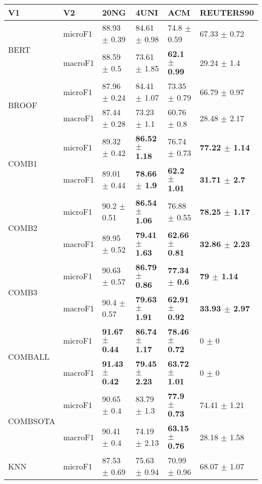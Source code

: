 \documentclass[]{article}
\begin{document}
\begin{table}[ht]
\centering
\begin{tabular}{llllll}
  \hline
V1 & V2 & 20NG & 4UNI & ACM & REUTERS90 \\ 
  \cline{3-6} \hline
\multirow{2}{*}{BERT} & microF1 & 88.93 $\pm$  0.39 & 84.61 $\pm$  0.98 & 74.8 $\pm$  0.59 & 67.33 $\pm$  0.72 \\ 
   & macroF1 & 88.59 $\pm$  0.5 & 73.61 $\pm$  1.85 & \bf{62.1 $\pm$  0.99} & 29.24 $\pm$  1.4 \\ 
   \cline{3-6}\multirow{2}{*}{BROOF} & microF1 & 87.96 $\pm$  0.24 & 84.41 $\pm$  1.07 & 73.35 $\pm$  0.79 & 66.79 $\pm$  0.97 \\ 
   & macroF1 & 87.44 $\pm$  0.28 & 73.23 $\pm$  1.1 & 60.76 $\pm$  0.8 & 28.48 $\pm$  2.17 \\ 
   \cline{3-6}\multirow{2}{*}{COMB1} & microF1 & 89.32 $\pm$  0.42 & \bf{86.52 $\pm$  1.18} & 76.74 $\pm$  0.73 & \bf{77.22 $\pm$  1.14} \\ 
   & macroF1 & 89.01 $\pm$  0.44 & \bf{78.66 $\pm$  1.9} & \bf{62.2 $\pm$  1.01} & \bf{31.71 $\pm$  2.7} \\ 
   \cline{3-6}\multirow{2}{*}{COMB2} & microF1 & 90.2 $\pm$  0.51 & \bf{86.54 $\pm$  1.06} & 76.88 $\pm$  0.55 & \bf{78.25 $\pm$  1.17} \\ 
   & macroF1 & 89.95 $\pm$  0.52 & \bf{79.41 $\pm$  1.63} & \bf{62.66 $\pm$  0.81} & \bf{32.86 $\pm$  2.23} \\ 
   \cline{3-6}\multirow{2}{*}{COMB3} & microF1 & 90.63 $\pm$  0.57 & \bf{86.79 $\pm$  0.86} & \bf{77.34 $\pm$  0.6} & \bf{79 $\pm$  1.14} \\ 
   & macroF1 & 90.4 $\pm$  0.57 & \bf{79.63 $\pm$  1.91} & \bf{62.91 $\pm$  0.92} & \bf{33.93 $\pm$  2.97} \\ 
   \cline{3-6}\multirow{2}{*}{COMBALL} & microF1 & \bf{91.67 $\pm$  0.44} & \bf{86.74 $\pm$  1.17} & \bf{78.46 $\pm$  0.72} & 0 $\pm$  0 \\ 
   & macroF1 & \bf{91.43 $\pm$  0.42} & \bf{79.45 $\pm$  2.23} & \bf{63.72 $\pm$  1.01} & 0 $\pm$  0 \\ 
   \cline{3-6}\multirow{2}{*}{COMBSOTA} & microF1 & 90.65 $\pm$  0.4 & 83.79 $\pm$  1.3 & \bf{77.9 $\pm$  0.73} & 74.41 $\pm$  1.21 \\ 
   & macroF1 & 90.41 $\pm$  0.4 & 74.19 $\pm$  2.13 & \bf{63.15 $\pm$  0.76} & 28.18 $\pm$  1.58 \\ 
   \cline{3-6}\multirow{2}{*}{KNN} & microF1 & 87.53 $\pm$  0.69 & 75.63 $\pm$  0.94 & 70.99 $\pm$  0.96 & 68.07 $\pm$  1.07 \\ 

\end{tabular}
\end{table}
\end{document}

